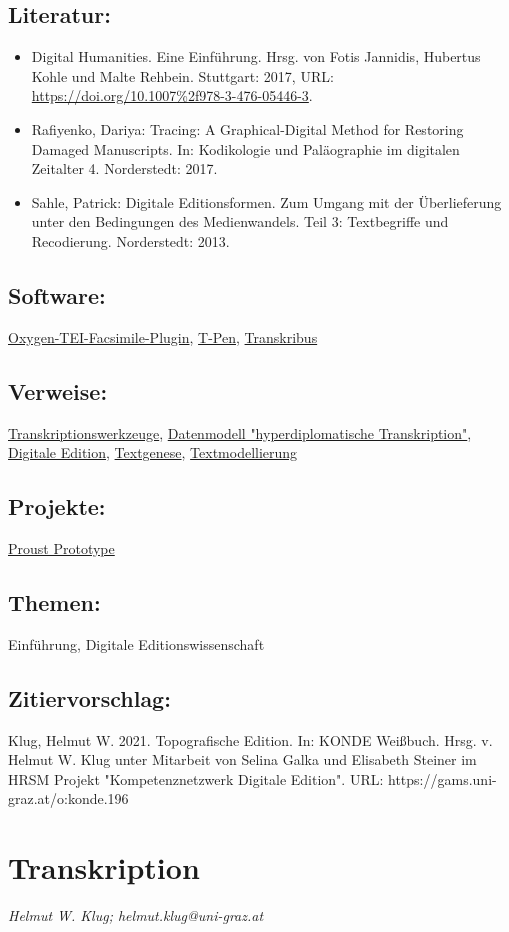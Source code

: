 \documentclass{article}
\begin{document}
        \subsection*{Literatur:}\begin{itemize}\item Digital Humanities. Eine Einführung. Hrsg. von Fotis Jannidis, Hubertus Kohle und Malte Rehbein. Stuttgart: 2017, URL: \url{https://doi.org/10.1007%2f978-3-476-05446-3}.\item Rafiyenko, Dariya: Tracing: A Graphical-Digital Method for Restoring Damaged Manuscripts. In: Kodikologie und Paläographie im digitalen Zeitalter 4. Norderstedt: 2017.\item Sahle, Patrick: Digitale Editionsformen. Zum Umgang mit der Überlieferung unter den Bedingungen des Medienwandels. Teil 3: Textbegriffe und Recodierung. Norderstedt: 2013.\end{itemize}\subsection*{Software:}\href{https://github.com/oxygenxml/TEI-Facsimile-Plugin}{Oxygen-TEI-Facsimile-Plugin}, \href{http://t-pen.org/TPEN/}{T-Pen}, \href{https://transkribus.eu/Transkribus/}{Transkribus}\subsection*{Verweise:}\href{https://gams.uni-graz.at/o:konde.99}{Transkriptionswerkzeuge}, \href{https://gams.uni-graz.at/o:konde.50}{Datenmodell "hyperdiplomatische Transkription"}, \href{https://gams.uni-graz.at/o:konde.59}{Digitale Edition}, \href{https://gams.uni-graz.at/o:konde.28}{Textgenese}, \href{https://gams.uni-graz.at/o:konde.195}{Textmodellierung}\subsection*{Projekte:}\href{http://research.cch.kcl.ac.uk/proust_prototype/}{Proust Prototype}\subsection*{Themen:}Einführung, Digitale Editionswissenschaft\subsection*{Zitiervorschlag:}Klug, Helmut W. 2021. Topografische Edition. In: KONDE Weißbuch. Hrsg. v. Helmut W. Klug unter Mitarbeit von Selina Galka und Elisabeth Steiner im HRSM Projekt "Kompetenznetzwerk Digitale Edition". URL: https://gams.uni-graz.at/o:konde.196\newpage\section*{Transkription} \emph{Helmut W. Klug; helmut.klug@uni-graz.at}\\
        
\end{document}
